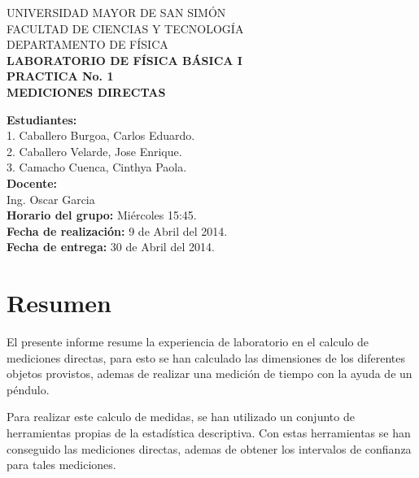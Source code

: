 \documentclass[letter,11pt]{article}
\newcommand{\blankpage}{
\newpage
\thispagestyle{empty}
\mbox{}
\newpage
}
\begin{document}
\begin{titlepage}
\begin{center}
{\Large UNIVERSIDAD MAYOR DE SAN SIMÓN}\\
\vspace*{0.15cm}
{\large FACULTAD DE CIENCIAS Y TECNOLOGÍA}\\
\vspace*{0.10cm}
DEPARTAMENTO DE FÍSICA\\
\vspace*{3.0cm}
{\Large \textbf{LABORATORIO DE FÍSICA BÁSICA I}}\\
\vspace*{0.3cm}
{\Large \textbf{PRACTICA No. 1}}\\
\vspace*{3.5cm}
{\Large \textbf{MEDICIONES DIRECTAS}}\\
\end{center}

\vspace*{6.0cm}
\leftskip=7.95cm
\noindent
\textbf{Estudiantes:}\\
1. Caballero Burgoa, Carlos Eduardo.\\
2. Caballero Velarde, Jose Enrique.\\
3. Camacho Cuenca, Cinthya Paola.\\
\newline
\textbf{Docente:}\\
Ing. Oscar Garcia\\
\newline
\textbf{Horario del grupo:} Miércoles 15:45.\\
\textbf{Fecha de realización:} 9 de Abril del 2014.\\
\textbf{Fecha de entrega:} 30 de Abril del 2014.\\

\end{titlepage}

\blankpage

\section{Resumen}
El presente informe resume la experiencia de laboratorio en el calculo de
mediciones directas, para esto se han calculado las dimensiones de los
diferentes objetos provistos, ademas de realizar una medición de tiempo con la
ayuda de un péndulo.

Para realizar este calculo de medidas, se han utilizado un conjunto de
herramientas propias de la estadística descriptiva. Con estas herramientas se
han conseguido las mediciones directas, ademas de obtener los intervalos de
confianza para tales mediciones.
\end{document}
